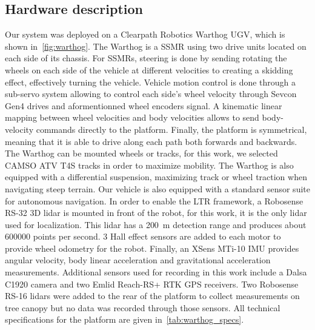 \subsection{Hardware description}
\label{sec:hardware}

Our system was deployed on a Clearpath Robotics Warthog \ac{UGV}, which is shown in~\autoref{fig:warthog}. 
The Warthog is a \ac{SSMR} using two drive units located on each side of its chassis. 
For \acp{SSMR}, steering is done by sending rotating the wheels on each side of the vehicle at different velocities to creating a skidding effect, effectively turning the vehicle.
Vehicle motion control is done through a sub-servo system allowing to control each side's wheel velocity through Sevcon Gen4 drives and aformentionned wheel encoders signal.
A kinematic linear mapping between wheel velocities and body velocities allows to send body-velocity commands directly to the platform.
Finally, the platform is symmetrical, meaning that it is able to drive along each path both forwards and backwards.
The Warthog can be mounted wheels or tracks, for this work, we selected CAMSO ATV T4S tracks in order to maximize mobility. 
The Warthog is also equipped with a differential suspension, maximizing track or wheel traction when navigating steep terrain.
Our vehicle is also equipped with a standard sensor suite for autonomous navigation. 
In order to enable the \ac{LTR} framework, a Robosense RS-32 3D lidar is mounted in front of the robot, for this work, it is the only lidar used for localization.
This lidar has a \SI{200}{m} detection range and produces about \SI{600000}{} points per second.
3 Hall effect sensors are added to each motor to provide wheel odometry for the robot. 
Finally, an XSens MTi-10 \ac{IMU} provides angular velocity, body linear acceleration and gravitational acceleration measurements. 
Additional sensors used for recording in this work include a Dalsa C1920 camera and two Emlid Reach-RS+ \ac {RTK} \ac{GPS} receivers.
Two Robosense RS-16 lidars were added to the rear of the platform to collect measurements on tree canopy but no data was recorded through those sensors. 
All technical specifications for the platform are given in~\autoref{tab:warthog_specs}.



